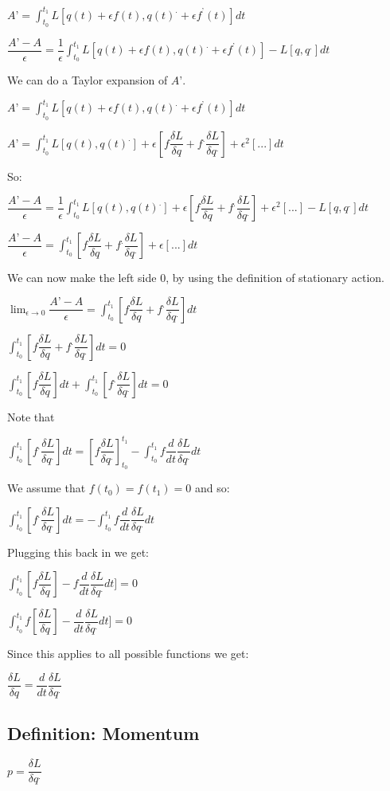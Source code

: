 \(A’=\int_{t_0}^{t_1} L[q(t)+\epsilon f(t), q(t)^.+\epsilon f^’(t)]dt\)

\(\dfrac{A’-A}{\epsilon }=\dfrac{1}{\epsilon}\int_{t_0}^{t_1} L[q(t)+\epsilon f(t), q(t)^.+\epsilon f^’(t)]-L[q,q^.]dt\)

We can do a Taylor expansion of \(A’\).

\(A’=\int_{t_0}^{t_1} L[q(t)+\epsilon f(t), q(t)^.+\epsilon f^’(t)]dt\)

\(A’=\int_{t_0}^{t_1} L[q(t),q(t)^.]+\epsilon [f\dfrac{\delta L}{\delta q}+f^.\dfrac{\delta L}{\delta q^.}]+\epsilon^2 [...]dt\)

So:

\(\dfrac{A’-A}{\epsilon }=\dfrac{1}{\epsilon}\int_{t_0}^{t_1}L[q(t),q(t)^.]+\epsilon [f\dfrac{\delta L}{\delta q}+f^.\dfrac{\delta L}{\delta q^.}]+\epsilon^2 [...]-L[q,q^.]dt\)

\(\dfrac{A’-A}{\epsilon }=\int_{t_0}^{t_1}[f\dfrac{\delta L}{\delta q}+f^.\dfrac{\delta L}{\delta q^.}]+\epsilon [...]dt\)

We can now make the left side \(0\), by using the definition of stationary action.

\(\lim_{\epsilon \rightarrow 0} \dfrac{A’-A}{\epsilon }=\int_{t_0}^{t_1}[f\dfrac{\delta L}{\delta q}+f^.\dfrac{\delta L}{\delta q^.}]dt\)

\(\int_{t_0}^{t_1}[f\dfrac{\delta L}{\delta q}+f^.\dfrac{\delta L}{\delta q^.}]dt=0\)

\(\int_{t_0}^{t_1}[f\dfrac{\delta L}{\delta q}]dt +\int_{t_0}^{t_1}[f^.\dfrac{\delta L}{\delta q^.}]dt=0\)

Note that

\(\int_{t_0}^{t_1}[f^.\dfrac{\delta L}{\delta q^.}]dt=[f\dfrac{\delta L}{\delta q^.}]_{t_0}^{t_1}-\int_{t_0}^{t_1}f \dfrac{d}{dt}\dfrac{\delta L}{\delta q^.}dt\)

We assume that \(f(t_0)=f(t_1)=0\) and so:

\(\int_{t_0}^{t_1}[f^.\dfrac{\delta L}{\delta q^.}]dt=-\int_{t_0}^{t_1}f \dfrac{d}{dt}\dfrac{\delta L}{\delta q^.}dt\)

Plugging this back in we get:

\(\int_{t_0}^{t_1}[f\dfrac{\delta L}{\delta q}]-f \dfrac{d}{dt}\dfrac{\delta L}{\delta q^.}dt]=0\)

\(\int_{t_0}^{t_1}f[\dfrac{\delta L}{\delta q}]-\dfrac{d}{dt}\dfrac{\delta L}{\delta q^.}dt]=0\)

Since this applies to all possible functions we get:

\(\dfrac{\delta L}{\delta q}=\dfrac{d}{dt}\dfrac{\delta L}{\delta q^.}\)

\subsection{Definition: Momentum}

\(p=\dfrac{\delta L}{\delta q^.}\)

